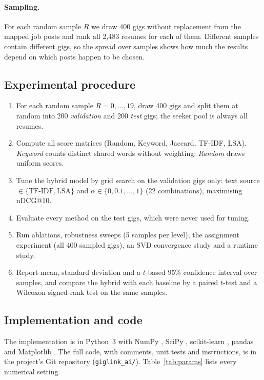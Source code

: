 \documentclass[12pt,a4paper]{article}
\numberwithin{equation}{section}
\theoremstyle{definition}
\theoremstyle{plain}
\newcommand{\DataSeekers}{2,483}
\begin{document}
\paragraph{Sampling.} For each random sample $R$ we draw 400 gigs without replacement from the mapped job posts and rank all \DataSeekers{} resumes for each of them. Different samples contain different gigs, so the spread over samples shows how much the results depend on which posts happen to be chosen.

\subsection{Experimental procedure}
\begin{enumerate}[nosep]
  \item For each random sample $R=0,\dots,19$, draw 400 gigs and split them at random into 200 \emph{validation} and 200 \emph{test} gigs; the seeker pool is always all resumes.
  \item Compute all score matrices (Random, Keyword, Jaccard, TF-IDF, LSA). \emph{Keyword} counts distinct shared words without weighting; \emph{Random} draws uniform scores.
  \item Tune the hybrid model by grid search on the validation gigs only: text source $\in\{\text{TF-IDF},\text{LSA}\}$ and $\alpha\in\{0,0.1,\dots,1\}$ (22 combinations), maximising nDCG@10.
  \item Evaluate every method on the test gigs, which were never used for tuning.
  \item Run ablations, robustness sweeps (5 samples per level), the assignment experiment (all 400 sampled gigs), an SVD convergence study and a runtime study.
  \item Report mean, standard deviation and a $t$-based 95\% confidence interval over samples, and compare the hybrid with each baseline by a paired $t$-test and a Wilcoxon signed-rank test \citep{wilcoxon1945individual} on the same samples.
\end{enumerate}

\subsection{Implementation and code}\label{sec:impl}
The implementation is in Python~3 with NumPy \citep{harris2020numpy}, SciPy \citep{virtanen2020scipy}, scikit-learn \citep{pedregosa2011scikit}, pandas and Matplotlib \citep{hunter2007matplotlib}. The full code, with comments, unit tests and instructions, is in the project's Git repository (\texttt{giglink\_ai/}). Table~\ref{tab:params} lists every numerical setting.
\end{document}
